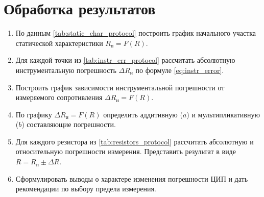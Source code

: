 \section{Обработка результатов}
\begin{enumerate}
    \item По данным \cref{tab:static_char_protocol} построить график начального участка статической характеристики $R_\text{п} = F(R)$.
    \item Для каждой точки из \cref{tab:instr_err_protocol} рассчитать абсолютную инструментальную погрешность $\Delta R_\text{и}$ по формуле \cref{eq:instr_error}.
    \item Построить график зависимости инструментальной погрешности от измеряемого сопротивления $\Delta R_\text{и} = F(R)$.
    \item По графику $\Delta R_\text{и} = F(R)$ определить аддитивную ($a$) и мультипликативную ($b$) составляющие погрешности.
    \item Для каждого резистора из \cref{tab:resistors_protocol} рассчитать абсолютную и относительную погрешности измерения. Представить результат в виде $R = R_\text{п} \pm \Delta R$.
    \item Сформулировать выводы о характере изменения погрешности ЦИП и дать рекомендации по выбору предела измерения.
\end{enumerate}

